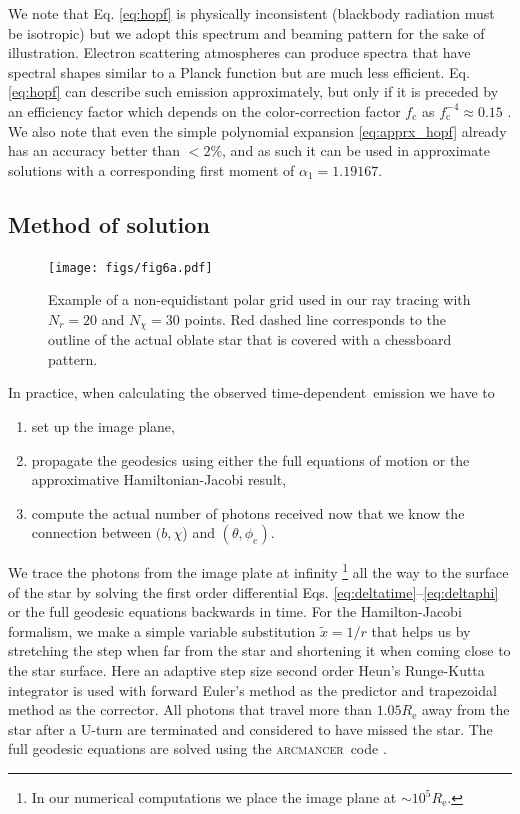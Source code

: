 \documentclass{aa}
\newcommand{\refe}[1]{#1}
\begin{document}
\refe{We note that Eq. \eqref{eq:hopf} is physically inconsistent (blackbody radiation must be isotropic) but we adopt this spectrum and beaming pattern for the sake of illustration. 
Electron scattering atmospheres can produce spectra that have spectral shapes similar to a Planck function but are much less efficient. 
Eq. \eqref{eq:hopf} can describe such emission approximately, but only if it is preceded by an efficiency factor which depends on the color-correction factor $f_{\mathrm{c}}$ as $f_{\mathrm{c}}^{-4} \approx 0.15$ \citep[see e.g.][]{SPW11, SPW12}.  }
We also note that even the simple polynomial expansion \eqref{eq:apprx_hopf} already has an accuracy better than $<2\%$, and as such it can be used in approximate solutions with a corresponding first moment of $\alpha_1 = 1.19167$.




\subsection{Method of solution}\label{sect:num_methods}


\begin{figure}
\centering
\texttt{[image: figs/fig6a.pdf]}
\caption{\label{fig:grid}
Example of a non-equidistant polar grid used in our ray tracing with $N_r = 20$ and $N_{\chi} = 30$ points.
    Red dashed line corresponds to the outline of the actual oblate star that is covered with a chessboard pattern.
}
\end{figure}

In practice, when calculating the observed \refe{time-dependent} emission we have to 
\begin{enumerate}
    \item set up the image plane, 
    \item propagate the geodesics using either the full equations of motion or the approximative Hamiltonian-Jacobi result, 
    \item compute the actual number of photons received now that we know the connection between $(b,\chi$) and $(\theta, \phi_e)$.
\end{enumerate}

We trace the photons from the image plate at infinity%
\footnote{\refe{ In our numerical computations we place the image plane at $\sim 10^5 R_{\mathrm{e}}$.}}
all the way to the surface of the star by solving the first order
differential Eqs. \eqref{eq:deltatime}--\eqref{eq:deltaphi} or the full geodesic equations backwards in time.  
For the Hamilton-Jacobi formalism, we make a simple variable substitution $\tilde{x} = 1/r$
 that helps us by stretching the step when
far from the star and shortening it when coming close to the star
surface.  Here an adaptive step size second order Heun's Runge-Kutta
integrator is used with forward Euler's method as
the predictor and trapezoidal method as the corrector.  
All photons that travel more than $1.05 R_{\mathrm{e}}$ away from the star after a U-turn are
terminated and considered to have missed the star.
The full geodesic equations are solved using the \textsc{arcmancer} code \citep[see][and the related equations therein]{PRJ16}.
\end{document}
